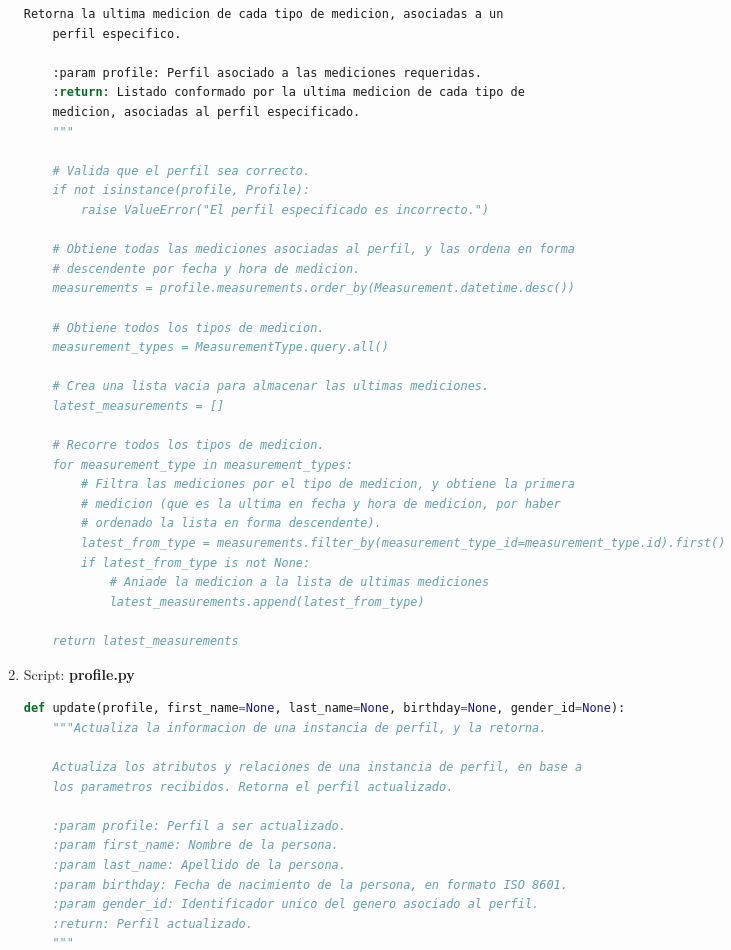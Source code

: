 \documentclass[a4paper,12pt]{article}
\begin{document}
\begin{enumerate}
\begin{lstlisting}[language=Python]
    Retorna la ultima medicion de cada tipo de medicion, asociadas a un
    perfil especifico.

    :param profile: Perfil asociado a las mediciones requeridas.
    :return: Listado conformado por la ultima medicion de cada tipo de
    medicion, asociadas al perfil especificado.
    """

    # Valida que el perfil sea correcto.
    if not isinstance(profile, Profile):
        raise ValueError("El perfil especificado es incorrecto.")

    # Obtiene todas las mediciones asociadas al perfil, y las ordena en forma
    # descendente por fecha y hora de medicion.
    measurements = profile.measurements.order_by(Measurement.datetime.desc())

    # Obtiene todos los tipos de medicion.
    measurement_types = MeasurementType.query.all()

    # Crea una lista vacia para almacenar las ultimas mediciones.
    latest_measurements = []

    # Recorre todos los tipos de medicion.
    for measurement_type in measurement_types:
        # Filtra las mediciones por el tipo de medicion, y obtiene la primera
        # medicion (que es la ultima en fecha y hora de medicion, por haber
        # ordenado la lista en forma descendente).
        latest_from_type = measurements.filter_by(measurement_type_id=measurement_type.id).first()
        if latest_from_type is not None:
            # Aniade la medicion a la lista de ultimas mediciones
            latest_measurements.append(latest_from_type)

    return latest_measurements
\end{lstlisting}

\item Script: \textbf{profile.py}

\begin{lstlisting}[language=Python]
def update(profile, first_name=None, last_name=None, birthday=None, gender_id=None):
    """Actualiza la informacion de una instancia de perfil, y la retorna.

    Actualiza los atributos y relaciones de una instancia de perfil, en base a
    los parametros recibidos. Retorna el perfil actualizado.

    :param profile: Perfil a ser actualizado.
    :param first_name: Nombre de la persona.
    :param last_name: Apellido de la persona.
    :param birthday: Fecha de nacimiento de la persona, en formato ISO 8601.
    :param gender_id: Identificador unico del genero asociado al perfil.
    :return: Perfil actualizado.
    """


\end{lstlisting}
\end{enumerate}
\end{document}
